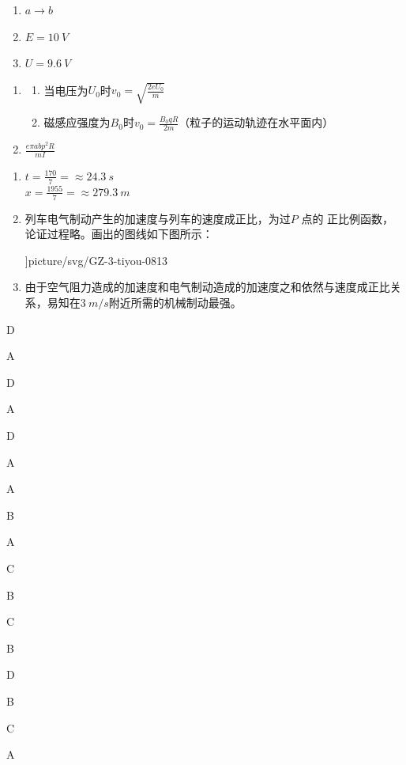\item \begin {enumerate} \item $a \rightarrow b$ \item $ E=10 \ V $ \item $ U=9.6 \ V $ \end {enumerate}
\item \begin {enumerate} \item \begin {enumerate} \item 当电压为$ U_{0} $时$v_{0}=\sqrt {\frac {2 e U_{0}}{m}}$ \item 磁感应强度为$ B_{0} $时$v_{0}=\frac {B_{0} q R}{2 m}$（粒子的运动轨迹在水平面内） \end {enumerate} \item $\frac {e \pi ab p^{2} R}{m I}$ \end {enumerate}
\item \begin {enumerate} \item $t=\frac {170}{7} = \approx 24.3 \ s $\\ $ x = \frac {1955}{7} = \approx 279.3 \ m$ \item 列车电气制动产生的加速度与列车的速度成正比，为过$ P $ 点的 正比例函数，论证过程略。画出的图线如下图所示： \begin {center} \linewidth ]{picture/svg/GZ-3-tiyou-0813} \end {center} \item 由于空气阻力造成的加速度和电气制动造成的加速度之和依然与速度成正比关系，易知在$ 3 \ m/s $附近所需的机械制动最强。 \end {enumerate}
\item D
\item A
\item D
\item A
\item D
\item A
\item A
\item B
\item A
\item C
\item B
\item C
\item B
\item D
\item B
\item C
\item A
